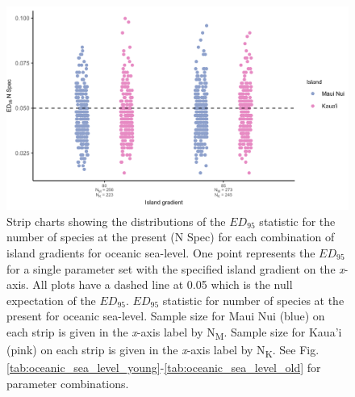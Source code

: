 \begin{figure}
    \centering
    \includegraphics[width=\textwidth]{JBI-21-0508_FigS11.png}
    \caption{Strip charts showing the distributions of the $ED_{95}$ statistic for the number of species at the present (N Spec) for each combination of island gradients for oceanic sea-level. One point represents the $ED_{95}$ for a single parameter set with the specified island gradient on the \textit{x}-axis. All plots have a dashed line at 0.05 which is the null expectation of the $ED_{95}$. $ED_{95}$ statistic for number of species at the present for oceanic sea-level. Sample size for Maui Nui (blue) on each strip is given in the \textit{x}-axis label by N\textsubscript{M}. Sample size for Kaua'i (pink) on each strip is given in the \textit{x}-axis label by N\textsubscript{K}. See Fig. \ref{tab:oceanic_sea_level_young}-\ref{tab:oceanic_sea_level_old} for parameter combinations.}
    \label{fig:Island_gradient_sea_level_num_spec}
\end{figure}

